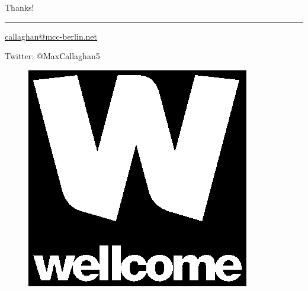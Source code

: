 \documentclass[9pt,aspectratio=169]{beamer}
\begin{document}
	
\begin{frame}
	Thanks!
	
	\bigskip
	
	\hrule
	
	\bigskip
	
	\url{callaghan@mcc-berlin.net}
	 
	\medskip
	
	Twitter: @MaxCallaghan5
	
	\bigskip
	
	\begin{figure}
	\includegraphics[width=0.1\columnwidth]{images/wellcome-logo-black.eps}
	\end{figure}
\end{frame}
	



\begin{frame}
	
\end{frame}
\end{document}
